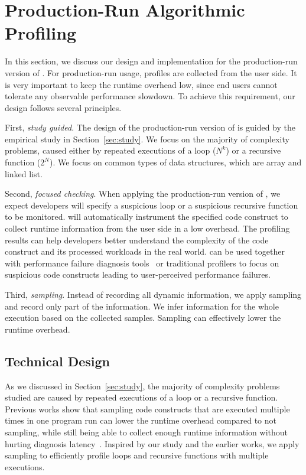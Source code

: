 \section{Production-Run Algorithmic Profiling}
\label{sec:online}

In this section, we discuss our design and 
implementation for the production-run version of \Tool. 
For production-run usage, profiles are collected from the user side.
It is very important to keep the runtime overhead low, since
end users cannot tolerate any observable performance slowdown.
To achieve this requirement,
our design follows several principles. 

First, \textit{study guided}. 
The design of the production-run version of \Tool
is guided by the empirical study in Section~\ref{sec:study}.
We focus on the majority of complexity problems, 
caused either by repeated executions of a loop ($N^k$)
or a recursive function ($2^N$).
We focus on common types of data structures, which are array and linked list.

Second, \textit{focused checking}.
When applying the production-run version of \Tool, 
we expect developers will specify a suspicious loop or a suspicious recursive function
to be monitored. 
\Tool will automatically instrument the specified code construct 
to collect runtime information from the user side in a low overhead. 
The profiling results can help developers better understand the complexity of the code construct 
and its processed workloads in the real world.
\Tool can be used together with performance failure 
diagnosis tools~\cite{SongOOPSLA2014} 
or traditional profilers to
focus on suspicious code constructs leading 
to user-perceived performance failures.

Third, \textit{sampling}.
Instead of recording all dynamic information, 
we apply sampling and record only part of the information. 
We infer information for the whole execution based on the collected samples. 
Sampling can effectively lower the runtime overhead. 


\subsection{Technical Design}
As we discussed in Section~\ref{sec:study}, 
the majority of complexity problems studied are caused 
by repeated executions of a loop or a recursive function. 
Previous works show that sampling code constructs that are executed 
multiple times in one program run can lower the runtime overhead compared to not sampling, 
while still being able to collect enough runtime information 
without hurting diagnosis latency~\cite{SongOOPSLA2014,ldoctor}. 
Inspired by our study and the earlier works, 
we apply sampling to efficiently profile loops 
and recursive functions with multiple executions. 

